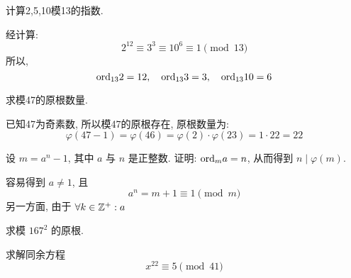 \begin{problem}
    计算2,5,10模13的指数.
    \begin{answer}
        经计算:
        \[2^{12} \equiv 3^{3} \equiv 10^6 \equiv 1 \pmod{13}\]
        所以,
        \[\mathrm{ord}_{13} 2=12,\quad \mathrm{ord}_{13} 3=3, \quad \mathrm{ord}_{13} 10=6\]
    \end{answer}
\end{problem}

\begin{problem}
    求模47的原根数量.
    \begin{answer}
        已知47为奇素数, 所以模47的原根存在, 原根数量为:
        \[\varphi(47-1)= \varphi(46) = \varphi(2)\cdot\varphi(23)= 1 \cdot 22 = 22\]
    \end{answer}
\end{problem}

\begin{problem}
    设 \(m = a^n - 1\), 其中 \(a\) 与 \(n\) 是正整数. 证明:
    \(\mathrm{ord}_{m} a = n\), 从而得到 \(n \mid \varphi(m)\).
\begin{answer}
    容易得到 \(a \ne 1\), 且
    \[a^n = m + 1 \equiv 1 \pmod{m}\]
    另一方面, 由于 \(\forall k \in \mathbb{Z}^+ : a^{}\)
\end{answer}
\end{problem}

\begin{problem}
    求模 \(167^2\) 的原根.
\end{problem}

\begin{problem}
    求解同余方程
    \[x^{22} \equiv 5 \pmod{41}\]
\end{problem}

